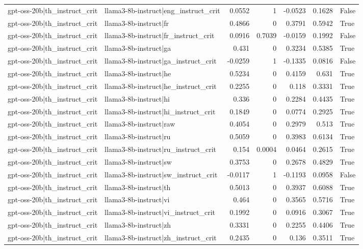 \begin{table}
\begin{tabular}{l l r r r r l}
gpt-oss-20b|th_instruct_crit & llama3-8b-instruct|eng_instruct_crit & 0.0552 & 1 & -0.0523 & 0.1628 & False \\
gpt-oss-20b|th_instruct_crit & llama3-8b-instruct|fr & 0.4866 & 0 & 0.3791 & 0.5942 & True \\
gpt-oss-20b|th_instruct_crit & llama3-8b-instruct|fr_instruct_crit & 0.0916 & 0.7039 & -0.0159 & 0.1992 & False \\
gpt-oss-20b|th_instruct_crit & llama3-8b-instruct|ga & 0.431 & 0 & 0.3234 & 0.5385 & True \\
gpt-oss-20b|th_instruct_crit & llama3-8b-instruct|ga_instruct_crit & -0.0259 & 1 & -0.1335 & 0.0816 & False \\
gpt-oss-20b|th_instruct_crit & llama3-8b-instruct|he & 0.5234 & 0 & 0.4159 & 0.631 & True \\
gpt-oss-20b|th_instruct_crit & llama3-8b-instruct|he_instruct_crit & 0.2255 & 0 & 0.118 & 0.3331 & True \\
gpt-oss-20b|th_instruct_crit & llama3-8b-instruct|hi & 0.336 & 0 & 0.2284 & 0.4435 & True \\
gpt-oss-20b|th_instruct_crit & llama3-8b-instruct|hi_instruct_crit & 0.1849 & 0 & 0.0774 & 0.2925 & True \\
gpt-oss-20b|th_instruct_crit & llama3-8b-instruct|raw & 0.4054 & 0 & 0.2979 & 0.513 & True \\
gpt-oss-20b|th_instruct_crit & llama3-8b-instruct|ru & 0.5059 & 0 & 0.3983 & 0.6134 & True \\
gpt-oss-20b|th_instruct_crit & llama3-8b-instruct|ru_instruct_crit & 0.154 & 0.0004 & 0.0464 & 0.2615 & True \\
gpt-oss-20b|th_instruct_crit & llama3-8b-instruct|sw & 0.3753 & 0 & 0.2678 & 0.4829 & True \\
gpt-oss-20b|th_instruct_crit & llama3-8b-instruct|sw_instruct_crit & -0.0117 & 1 & -0.1193 & 0.0958 & False \\
gpt-oss-20b|th_instruct_crit & llama3-8b-instruct|th & 0.5013 & 0 & 0.3937 & 0.6088 & True \\
gpt-oss-20b|th_instruct_crit & llama3-8b-instruct|vi & 0.464 & 0 & 0.3565 & 0.5716 & True \\
gpt-oss-20b|th_instruct_crit & llama3-8b-instruct|vi_instruct_crit & 0.1992 & 0 & 0.0916 & 0.3067 & True \\
gpt-oss-20b|th_instruct_crit & llama3-8b-instruct|zh & 0.3331 & 0 & 0.2255 & 0.4406 & True \\
gpt-oss-20b|th_instruct_crit & llama3-8b-instruct|zh_instruct_crit & 0.2435 & 0 & 0.136 & 0.3511 & True \\

\end{tabular}
\end{table}
